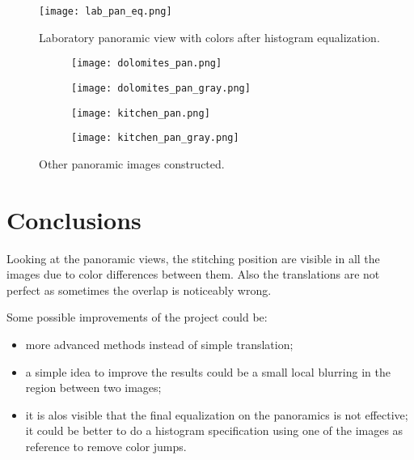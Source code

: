 \documentclass[11pt,a4paper]{article}
\begin{document}
\begin{figure}[h]
	\centering
	\texttt{[image: lab\_pan\_eq.png]}
	\caption{Laboratory panoramic view with colors after histogram equalization.}
	\label{fig:lab_eq}
\end{figure}

\begin{figure}[h]
	\centering
	\begin{subfigure}{1\textwidth}
		\texttt{[image: dolomites\_pan.png]}
	\end{subfigure}
	\hfill
	\vspace{10pt}
	\begin{subfigure}{1\textwidth}
		\texttt{[image: dolomites\_pan\_gray.png]}
	\end{subfigure}
	\hfill
	\vspace{10pt}
	\begin{subfigure}{1\textwidth}
		\texttt{[image: kitchen\_pan.png]}
	\end{subfigure}%
    \hfill
    \vspace{10pt}
	\begin{subfigure}{1\textwidth}
		\texttt{[image: kitchen\_pan\_gray.png]}
	\end{subfigure}
	\hfill
	\vspace{10pt}
	\caption{Other panoramic images constructed.}
	\label{fig:others}
\end{figure}

\section{Conclusions} %

Looking at the panoramic views, the stitching position are visible in all the images due to color differences between them. Also the translations are not perfect as sometimes the overlap is noticeably wrong.

Some possible improvements of the project could be:
\begin{itemize}
	\item more advanced methods instead of simple translation;
	\item a simple idea to improve the results could be a small local blurring in the region between two images;
	\item it is alos visible that the final equalization on the panoramics is not effective; it could be better to do a histogram specification using one of the images as reference to remove color jumps.
\end{itemize}
\end{document}
